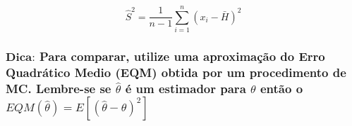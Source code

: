 \documentclass[
]{article}
\begin{document}
\[
\hat{S}^2 = \frac{1}{n-1} \sum_{i=1}^{n} (x_i - \bar{H})^2 
\]

\subsubsection{\texorpdfstring{\(\textbf{Dica:}\) Para comparar, utilize
uma aproximação do Erro Quadrático Medio (EQM) obtida por um
procedimento de MC. Lembre-se se \(\hat{\theta}\) é um estimador para
\(\theta\) então o
\(EQM(\hat{\theta}) = E[(\hat{\theta} - \theta)^2]\)}{\textbackslash textbf\{Dica:\} Para comparar, utilize uma aproximação do Erro Quadrático Medio (EQM) obtida por um procedimento de MC. Lembre-se se \textbackslash hat\{\textbackslash theta\} é um estimador para \textbackslash theta então o EQM(\textbackslash hat\{\textbackslash theta\}) = E{[}(\textbackslash hat\{\textbackslash theta\} - \textbackslash theta)\^{}2{]}}}\label{textbfdica-para-comparar-utilize-uma-aproximauxe7uxe3o-do-erro-quadruxe1tico-medio-eqm-obtida-por-um-procedimento-de-mc.-lembre-se-se-hattheta-uxe9-um-estimador-para-theta-entuxe3o-o-eqmhattheta-ehattheta---theta2}
\end{document}
